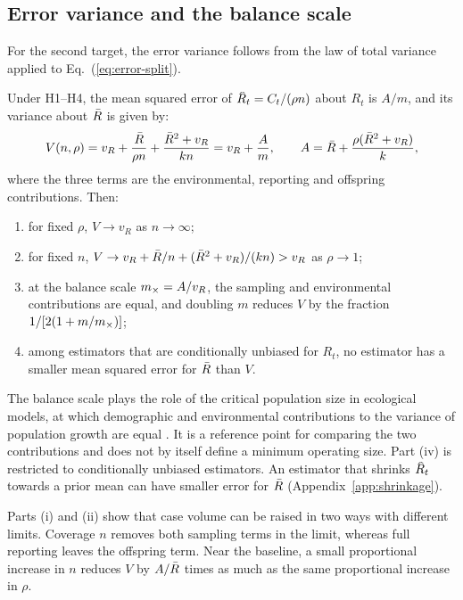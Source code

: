 \subsection{Error variance and the balance scale}
\label{sec:bg-variance}

For the second target, the error variance follows from the law of total variance applied to Eq.~(\ref{eq:error-split}).

\begin{proposition}
\label{prop:average}
Under H1--H4, the mean squared error of $\Rhat_t=C_t/(\rho n)$ about $R_t$ is $A/m$, and its variance about $\bar{R}$ is given by:
\begin{equation}
  V(n,\rho)=v_R+\frac{\bar{R}}{\rho n}+\frac{\bar{R}^2+v_R}{kn}=v_R+\frac{A}{m},
  \qquad A=\bar{R}+\frac{\rho(\bar{R}^2+v_R)}{k},
  \label{eq:var-average}
\end{equation}
where the three terms are the environmental, reporting and offspring contributions. Then:
\begin{enumerate}[label=(\roman*),leftmargin=2em]
  \item for fixed $\rho$, $V\to v_R$ as $n\to\infty$;
  \item for fixed $n$, $V\to v_R+\bar{R}/n+(\bar{R}^2+v_R)/(kn)>v_R$ as $\rho\to1$;
  \item at the balance scale $m_{\times}=A/v_R$, the sampling and environmental contributions are equal, and doubling $m$ reduces $V$ by the fraction $1/[2(1+m/m_{\times})]$;
  \item among estimators that are conditionally unbiased for $R_t$, no estimator has a smaller mean squared error for $\bar{R}$ than $V$.
\end{enumerate}
\end{proposition}

The balance scale plays the role of the critical population size in ecological models, at which demographic and environmental contributions to the variance of population growth are equal \citep{lande1993risks, lande2003stochastic}. It is a reference point for comparing the two contributions and does not by itself define a minimum operating size. Part (iv) is restricted to conditionally unbiased estimators. An estimator that shrinks $\Rhat_t$ towards a prior mean can have smaller error for $\bar{R}$ (Appendix~\ref{app:shrinkage}).

Parts (i) and (ii) show that case volume can be raised in two ways with different limits. Coverage $n$ removes both sampling terms in the limit, whereas full reporting leaves the offspring term. Near the baseline, a small proportional increase in $n$ reduces $V$ by $A/\bar{R}$ times as much as the same proportional increase in $\rho$.

